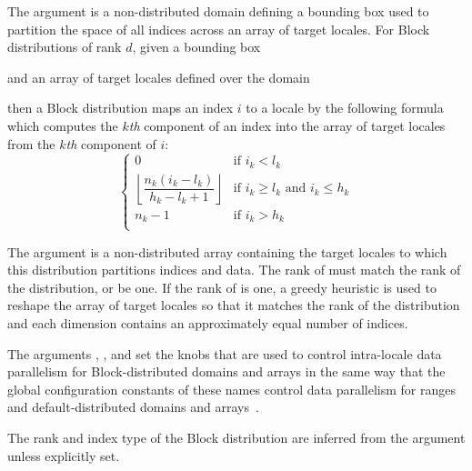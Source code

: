 The argument  is a non-distributed domain defining a
bounding box used to partition the space of all indices across an
array of target locales.  For Block distributions of rank $d$, given
a bounding box
\begin{chapel}
[$l_1$..$h_1$, $\ldots$, $l_d$..$h_d$]
\end{chapel}
and an array of target locales defined over the domain
\begin{chapel}
[$0$..$n_1$, $\ldots$, $0$..$n_d$]
\end{chapel}
then a Block distribution maps an index $i$ to a locale by the
following formula which computes the $k$\emph{th} component of an
index into the array of target locales from the $k$\emph{th} component
of $i$:
\[
\left\{
  \begin{array}{ll}
    0 & \mbox{if $i_k < l_k$} \\
    \left\lfloor\dfrac{n_k (i_k - l_k)}{h_k - l_k + 1}\right\rfloor & \mbox{if $i_k \geq l_k$ and $i_k \leq h_k$} \\
    n_k-1 & \mbox{if $i_k > h_k$} \\
  \end{array}
\right.
\]

The argument  is a non-distributed array
containing the target locales to which this distribution partitions
indices and data.  The rank of  must match the
rank of the distribution, or be one.  If the rank of
 is one, a greedy heuristic is used to reshape the
array of target locales so that it matches the rank of the
distribution and each dimension contains an approximately equal number
of indices.

The arguments ,
, and  set
the knobs that are used to control intra-locale data parallelism for
Block-distributed domains and arrays in the same way that the global
configuration constants of these names control data parallelism for
ranges and default-distributed domains and
arrays~.

The rank and index type of the Block distribution are inferred from
the  argument unless explicitly set.

